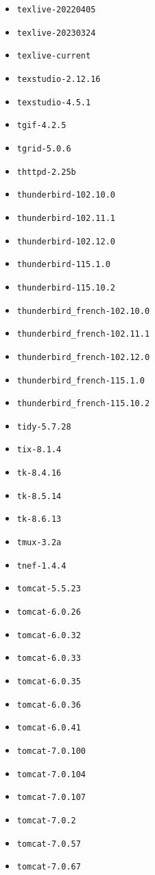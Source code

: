 \begin{itemize}
\item \verb|texlive-20220405|
\item \verb|texlive-20230324|
\item \verb|texlive-current|
\item \verb|texstudio-2.12.16|
\item \verb|texstudio-4.5.1|
\item \verb|tgif-4.2.5|
\item \verb|tgrid-5.0.6|
\item \verb|thttpd-2.25b|
\item \verb|thunderbird-102.10.0|
\item \verb|thunderbird-102.11.1|
\item \verb|thunderbird-102.12.0|
\item \verb|thunderbird-115.1.0|
\item \verb|thunderbird-115.10.2|
\item \verb|thunderbird_french-102.10.0|
\item \verb|thunderbird_french-102.11.1|
\item \verb|thunderbird_french-102.12.0|
\item \verb|thunderbird_french-115.1.0|
\item \verb|thunderbird_french-115.10.2|
\item \verb|tidy-5.7.28|
\item \verb|tix-8.1.4|
\item \verb|tk-8.4.16|
\item \verb|tk-8.5.14|
\item \verb|tk-8.6.13|
\item \verb|tmux-3.2a|
\item \verb|tnef-1.4.4|
\item \verb|tomcat-5.5.23|
\item \verb|tomcat-6.0.26|
\item \verb|tomcat-6.0.32|
\item \verb|tomcat-6.0.33|
\item \verb|tomcat-6.0.35|
\item \verb|tomcat-6.0.36|
\item \verb|tomcat-6.0.41|
\item \verb|tomcat-7.0.100|
\item \verb|tomcat-7.0.104|
\item \verb|tomcat-7.0.107|
\item \verb|tomcat-7.0.2|
\item \verb|tomcat-7.0.57|
\item \verb|tomcat-7.0.67|

\end{itemize}
